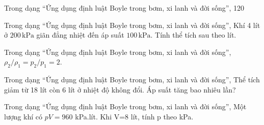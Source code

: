 \begin{ex}
\end{ex}

\begin{bt}
Trong dạng “Ứng dụng định luật Boyle trong bơm, xi lanh và đời sống”, 120
\end{bt}

\begin{ex}
Trong dạng “Ứng dụng định luật Boyle trong bơm, xi lanh và đời sống”, Khí 4 lít ở $200\,\text{kPa}$ giãn đẳng nhiệt đến áp suất $100\,\text{kPa}$. Tính thể tích sau theo lít.
\end{ex}

\begin{bt}
Trong dạng “Ứng dụng định luật Boyle trong bơm, xi lanh và đời sống”, $\rho_2/\rho_1=p_2/p_1=2$.
\end{bt}

\begin{ex}
Trong dạng “Ứng dụng định luật Boyle trong bơm, xi lanh và đời sống”, Thể tích giảm từ 18 lít còn 6 lít ở nhiệt độ không đổi. Áp suất tăng bao nhiêu lần?
\end{ex}

\begin{ex}
Trong dạng “Ứng dụng định luật Boyle trong bơm, xi lanh và đời sống”, Một lượng khí có $pV=960$ kPa.lít. Khi V=8 lít, tính p theo kPa.
\end{ex}

